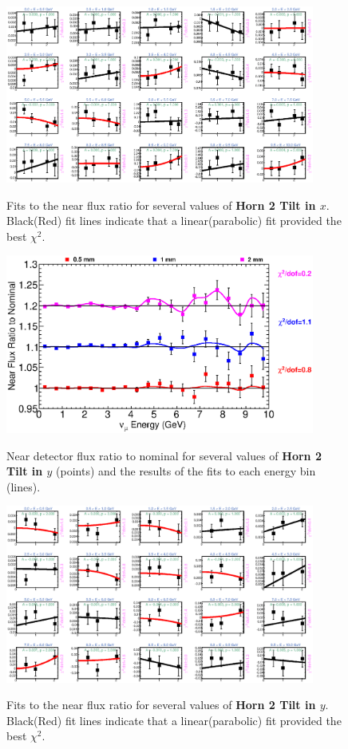 \begin{figure}[hb]
  \begin{center}
    {\includegraphics[width=4.0in]{figures/Horn2XTilt_near_fits.eps}}
  \end{center}
\caption{ Fits to the near flux ratio for several values of {\bf Horn 2 Tilt in $x$}. Black(Red) fit lines indicate that a linear(parabolic) fit provided the best $\chi^2$. }
\end{figure}

\begin{figure}[ht]
  \begin{center}
    {\includegraphics[width=4.0in]{figures/Horn2YTilt_near_summary.eps}}
  \end{center}
\caption{ Near detector flux ratio to nominal for several values of {\bf Horn 2 Tilt in $y$} (points) and the results of the fits to each energy bin (lines).}
\end{figure}

\begin{figure}[hb]
  \begin{center}
    {\includegraphics[width=4.0in]{figures/Horn2YTilt_near_fits.eps}}
  \end{center}
\caption{ Fits to the near flux ratio for several values of {\bf Horn 2 Tilt in $y$}. Black(Red) fit lines indicate that a linear(parabolic) fit provided the best $\chi^2$. }
\end{figure}

